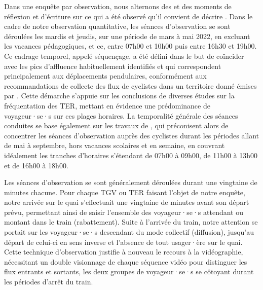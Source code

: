 \begin{refsegment}
Dans une enquête par observation, nous alternons des  et des moments de réflexion et d’écriture sur ce qui a été observé qu'il convient de décrire \textcolor{blue}{\autocite[15]{revillard_observation_2018}}. Dans le cadre de notre observation quantitative, les séances d'observation se sont déroulées les mardis et jeudis, sur une période de mars à mai 2022, en excluant les vacances pédagogiques, et ce, entre 07h00 et 10h00 puis entre 16h30 et 19h00. Ce cadrage temporel, appelé séquençage, a été défini dans le but de coïncider avec les pics d'affluence habituellement identifiés et qui correspondent principalement aux déplacements pendulaires, conformément aux recommandations de collecte des flux de cyclistes dans un territoire donné émises par \textcolor{blue}{\textcite[20]{johnstone_collecting_2017}}. Cette démarche s'appuie sur les conclusions de diverses études sur la fréquentation des \acrshort{TER}, mettant en évidence une prédominance de voyageur·se·s sur ces plages horaires. La temporalité générale des séances conduites se base également sur les travaux de \textcolor{blue}{\textcite[20]{johnstone_collecting_2017}}, qui préconisent alors de concentrer les séances d'observation auprès des cyclistes durant les périodes allant de mai à septembre, hors vacances scolaires et en semaine, en couvrant idéalement les tranches d'horaires s'étendant de 07h00 à 09h00, de 11h00 à 13h00 et de 16h00 à 18h00.%

Les séances d'observation se sont généralement déroulées durant une vingtaine de minutes chacune. Pour chaque \acrshort{TGV} ou \acrshort{TER} faisant l'objet de notre enquête, notre arrivée sur le quai s'effectuait une vingtaine de minutes avant son départ prévu, permettant ainsi de saisir l'ensemble des voyageur·se·s attendant ou montant dans le train (rabattement). Suite à l'arrivée du train, notre attention se portait sur les voyageur·se·s descendant du mode collectif (diffusion), jusqu'au départ de celui-ci en sens inverse et l'absence de tout usager·ère sur le quai. Cette technique d'observation justifie à nouveau le recours à la vidéographie, nécessitant un double visionnage de chaque séquence vidéo pour distinguer les flux entrants et sortants, les deux groupes de voyageur·se·s se côtoyant durant les périodes d'arrêt du train.%


\end{refsegment}

